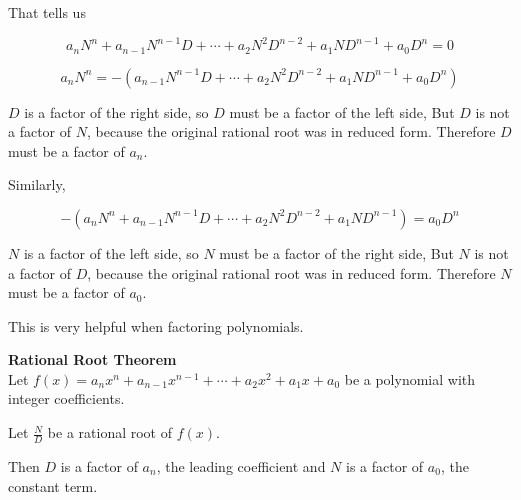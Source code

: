 \documentclass{ximera}
\begin{document}
That tells us

\[   a_n N^n + a_{n-1} N^{n-1} D + \cdots + a_2 N^2 D^{n-2}+ a_1 N D^{n-1} + a_0 D^n  = 0       \]



\[   a_n N^n  =   -(a_{n-1} N^{n-1} D + \cdots + a_2 N^2 D^{n-2}+ a_1 N D^{n-1} + a_0 D^n)      \]


$D$ is a factor of the right side, so $D$ must be a factor of the left side,  But $D$ is not a factor of $N$, because the original rational root was in reduced form.  Therefore $D$ must be a factor of $a_n$.




Similarly, 

\[   -(a_n N^n + a_{n-1} N^{n-1} D + \cdots + a_2 N^2 D^{n-2}+ a_1 N D^{n-1}) =  a_0 D^n        \]


$N$ is a factor of the left side, so $N$ must be a factor of the right side,  But $N$ is not a factor of $D$, because the original rational root was in reduced form.  Therefore $N$ must be a factor of $a_0$.




This is very helpful when factoring polynomials.





\begin{theorem} \textbf{\textcolor{blue!55!black}{Rational Root Theorem}} \\


Let $ f(x) = a_n x^n + a_{n-1} x^{n-1} + \cdots + a_2 x^2 + a_1 x + a_0 $ be a polynomial with integer coefficients.

Let $\frac{N}{D}$ be a rational root of $f(x)$.

Then $D$ is a factor of $a_n$, the leading coefficient and $N$ is a factor of $a_0$, the constant term.

\end{theorem}
\end{document}
